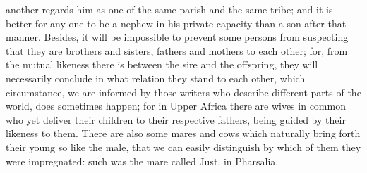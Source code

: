 another regards him as one of the same parish and the same tribe; and it
is better for any one to be a nephew in his private capacity than a son
after that manner. Besides, it will be impossible to prevent some persons
from suspecting that they are brothers and sisters, fathers and mothers to
each other; for, from the mutual likeness there is between the sire and
the offspring, they will necessarily conclude in what relation they stand
to each other, which circumstance, we are informed by those writers who
describe different parts of the world, does sometimes happen; for in Upper
Africa there are wives in common who yet deliver their children to their
respective fathers, being guided by their likeness to them. There are also
some mares and cows which naturally bring forth their young so like the
male, that we can easily distinguish by which of them they were
impregnated: such was the mare called Just, in Pharsalia.


